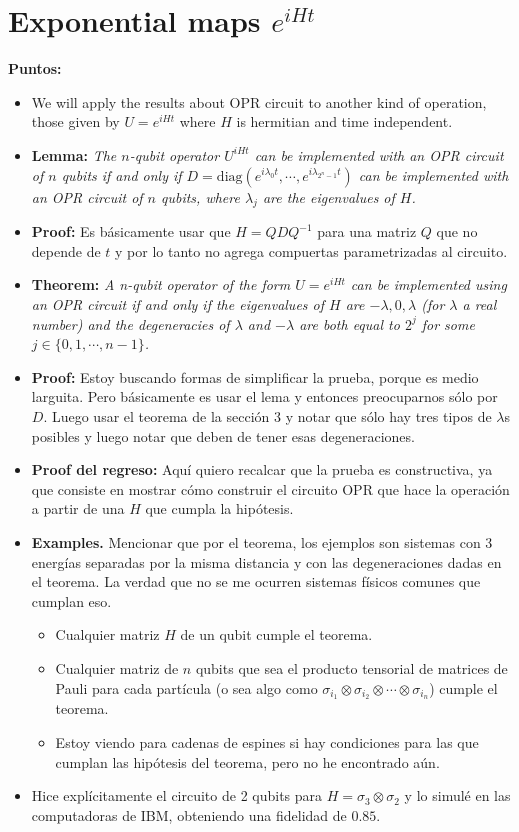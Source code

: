 \documentclass[10pt,letterpaper]{article} %
\begin{document}
\section{Exponential maps $e^{iHt}$} %
\label{sec: Exponential maps}
\textbf{Puntos:}
\begin{itemize}
\item We will apply the results about OPR circuit to another kind of operation, those given by $U  = e^{iHt}$ where $H$ is hermitian  and time independent.
\item \textbf{Lemma:}\textit{ The $n$-qubit operator $U^{iHt}$ can be implemented with an OPR circuit of $n$ qubits if and only if $D = \text{diag}(e^{i\lambda_0 t}, \cdots, e^{i \lambda_{2^n-1}t})$ can be implemented with an OPR circuit of $n$ qubits, where $\lambda_j$ are the eigenvalues of $H$.}
\item \textbf{Proof:}  Es b\'asicamente usar que $H = QDQ^{-1}$ para una matriz $Q$ que no depende de $t$ y por lo tanto no agrega compuertas parametrizadas al circuito. 
\item \textbf{Theorem:} \textit{ A n-qubit operator of the form $U = e^{iHt}$ can be implemented using an OPR circuit if and only if the eigenvalues of $H$ are $-\lambda,0,\lambda$ (for $\lambda$ a real number) and the degeneracies of $\lambda$ and $-\lambda$ are both equal to $2^j$ for some $j\in \{0,1,\cdots,n-1\}$.}
\item \textbf{Proof:} Estoy buscando formas de simplificar la prueba, porque es medio larguita. Pero básicamente es usar el lema y entonces preocuparnos sólo por $D$. Luego  usar el teorema de la sección 3 y notar que sólo hay tres tipos de  $\lambda$s posibles y luego notar que deben de tener esas degeneraciones.
\item \textbf{Proof del regreso:} Aquí quiero recalcar que la prueba es constructiva, ya que consiste en mostrar cómo construir el circuito OPR que hace la operación a partir de una $H$ que cumpla la hipótesis. 
\item \textbf{Examples.} Mencionar que por el teorema, los ejemplos son sistemas con 3 energías separadas por la misma distancia y con las degeneraciones dadas en el teorema. 
La verdad que no se me ocurren sistemas físicos comunes que cumplan eso.
\begin{itemize}
\item Cualquier matriz $H$ de un qubit cumple el teorema.
\item Cualquier matriz de $n$ qubits que sea el producto tensorial de matrices de Pauli para cada partícula (o sea algo como $\sigma_{i_1} \otimes \sigma_{i_2} \otimes \cdots \otimes \sigma_{i_n}$) cumple el teorema.
\item Estoy viendo para cadenas de espines si hay condiciones para las que cumplan las hipótesis del teorema, pero no he encontrado aún.
\end{itemize}
\item Hice explícitamente el circuito de 2 qubits para $H = \sigma_3 \otimes \sigma_2$ y lo simulé en las computadoras de IBM, obteniendo una fidelidad de $0.85$.
\end{itemize}
\end{document}
